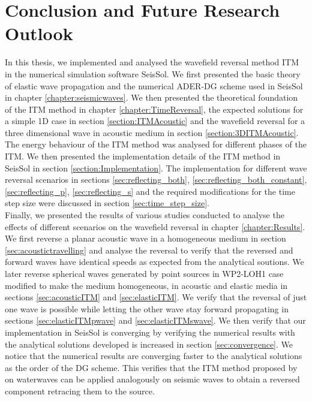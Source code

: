 \chapter{Conclusion and Future Research Outlook}\label{chapter:Conclusion}
In this thesis, we implemented and analysed the wavefield reversal method \ac{ITM} in the numerical simulation software SeisSol. We first presented the basic theory of elastic wave propagation and the numerical \ac{ADER}-\ac{DG} scheme used in SeisSol in chapter \ref{chapter:seismicwaves}.
We then presented the theoretical foundation of the \ac{ITM} method in chapter \ref{chapter:TimeReversal}, the expected solutions for a simple 1D case in section \ref{section:ITMAcoustic} and the wavefield reversal for a three dimensional wave in acoustic medium in section \ref{section:3DITMAcoustic}.
The energy behaviour of the \ac{ITM} method was analysed for different phases of the \ac{ITM}.
We then presented the implementation details of the \ac{ITM} method in SeisSol in section \ref{section:Implementation}. The implementation for different wave reversal scenarios in sections \ref{sec:reflecting_both}, \ref{sec:reflecting_both_constant}, \ref{sec:reflecting_p}, \ref{sec:reflecting_s} and the required modifications for the time step size were discussed in section \ref{sec:time_step_size}. \\

Finally, we presented the results of various studies conducted to analyse the effects of different scenarios on the wavefield reversal in chapter \ref{chapter:Results}.
We first reverse a planar acoustic wave in a homogeneous medium in section \ref{sec:acoustictravelling} and analyse the reversal to verify that the reversed and forward waves have identical speeds as expected from the analytical soutions.
We later reverse spherical waves generated by point sources in WP2-LOH1 case modified to make the medium homogeneous, in acoustic and elastic media in sections \ref{sec:acousticITM} and \ref{sec:elasticITM}. We verify that the reversal of just one wave is possible while letting 
the other wave stay forward propagating in sections \ref{sec:elasticITMpwave} and \ref{sec:elasticITMswave}. We then verify that our implementation in SeisSol is converging by verifying the numerical results with the analytical solutions developed is increased in section \ref{sec:convergence}. We notice that
the numerical results are converging faster to the analytical solutions as the order of the \ac{DG} scheme. This verifies that the \ac{ITM}
method proposed by ~\parencite{Bacot2016} on waterwaves can be applied analogously on seismic waves to obtain a reversed component retracing them to the source. \\

